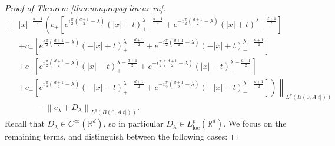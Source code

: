 \documentclass[a4paper, reqno, 11pt]{amsart}
\theoremstyle{definition}
\begin{document}
\begin{proof}[Proof of Theorem \ref{thm:nonpropag-linear-rn}]
\begin{align}
\left\| \right. & \left. |x|^{-\frac{d-1}{2}} \left( c_+ [ e^{i\frac{\pi}{2}(\frac{d+1}{2} - \lambda)} (|x| + t)_+^{\lambda-\frac{d+1}{2}} + e^{-i\frac{\pi}{2}(\frac{d+1}{2} - \lambda)} \left(|x| + t\right)_-^{\lambda-\frac{d+1}{2}}] \nonumber \right. \right. \\
&\left. + c_-  [ e^{i\frac{\pi}{2}(\frac{d+1}{2} - \lambda)}(-|x| + t)_+^{\lambda-\frac{d+1}{2}} + e^{-i\frac{\pi}{2}(\frac{d+1}{2} - \lambda)} \left(-|x| + t\right)_-^{\lambda-\frac{d+1}{2}} ]\right. \nonumber \\
& \left. + c_+ [ e^{i\frac{\pi}{2}(\frac{d+1}{2} - \lambda)} (|x| - t)_+^{\lambda-\frac{d+1}{2}} + e^{-i\frac{\pi}{2}(\frac{d+1}{2} - \lambda)} \left( |x| - t \right)_-^{\lambda-\frac{d+1}{2}}] \nonumber \right. \\
&\left. \left. + c_-  [ e^{i\frac{\pi}{2}(\frac{d+1}{2} - \lambda)}(-|x| - t)_+^{\lambda-\frac{d+1}{2}} + e^{-i\frac{\pi}{2}(\frac{d+1}{2} - \lambda)} \left(-|x| - t\right)_-^{\lambda-\frac{d+1}{2}} ]  \right) \right\|_{L^p(B(0,A|t|))} \nonumber \\
&\qquad - \left\| c_{\lambda} + D_{\lambda} \right\|_{L^p(B(0,A|t|))}.
\end{align}
Recall that $D_{\lambda} \in C^{\infty}(\mathbb{R}^d)$, so in particular $D_{\lambda} \in L^p_{\text{loc}}(\mathbb{R}^d)$. We focus on the remaining terms, and distinguish between the following cases:


\end{proof}
\end{document}
